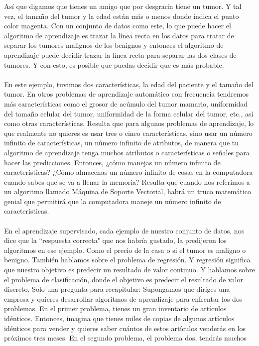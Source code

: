 \documentclass{book}
\begin{document}
Así que digamos que
tienes un amigo que por desgracia tiene un tumor. Y tal vez, el tamaño del tumor y la edad
están más o menos donde indica el punto color magenta. Con un conjunto de datos como este, lo que puede hacer el
algoritmo de aprendizaje es trazar la línea recta en los datos para tratar de separar los
tumores malignos de los benignos y entonces el algoritmo de aprendizaje puede decidir
trazar la línea recta para separar las dos clases de tumores.
Y con esto, es posible que puedas decidir que es más probable.\\\\En este ejemplo, tuvimos dos características,
la edad del paciente y el tamaño del tumor. En otros problemas de aprendizaje automático
con frecuencia tendremos más características como el grosor de acúmulo del
tumor mamario, uniformidad del tamaño celular del tumor, uniformidad de la forma celular del
tumor, etc., así como otras características. Resulta que para algunos problemas
de aprendizaje, lo que realmente no quieres es usar tres o cinco características, sino
usar un número infinito de características, un número infinito de
atributos, de manera que tu algoritmo de aprendizaje tenga muchos atributos o
características o señales para hacer las predicciones. Entonces, ¿cómo manejas un
número infinito de características? ¿Cómo almacenas un número infinito de
cosas en la computadora cuando sabes que se va a llenar la memoria? Resulta
que cuando nos referimos a un algoritmo llamado Máquina de
Soporte Vectorial, habrá un truco matemático genial que permitirá que la computadora maneje
un número infinito de características. \\\\ En el aprendizaje supervisado, cada ejemplo de
nuestro conjunto de datos, nos dice que la ``respuesta correcta" que nos habría gustado,
la predijeron los algoritmos en ese ejemplo. Como el precio de la
casa o si el tumor es maligno o benigno. También hablamos sobre el
problema de regresión. Y regresión significa que nuestro objetivo es predecir
un resultado de valor continuo. Y hablamos sobre el problema de clasificación, donde
el objetivo es predecir el resultado de valor discreto. Solo una pregunta para recapitular:
Supongamos que diriges una empresa y quieres desarrollar algoritmos de aprendizaje
para enfrentar los dos problemas. En el primer problema, tienes un gran inventario de
artículos idénticos. Entonces, imagina que tienes miles de copias de algunos artículos
idénticos para vender y quieres saber cuántos de estos artículos venderás en los
próximos tres meses. En el segundo problema, el problema dos, tendrás muchos
\end{document}
